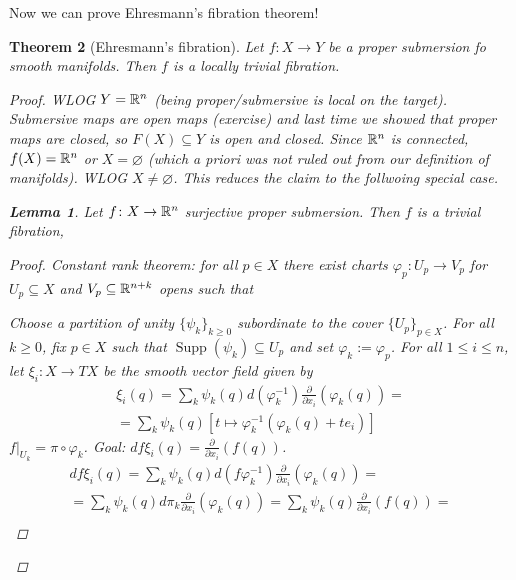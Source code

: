 \documentclass[A4paper, british, reqno]{amsart}
\theoremstyle{darkgreentheorem}
\newtheorem{thm}{Theorem}[section]
\newtheorem{lm}[thm]{Lemma}
\theoremstyle{darkbluedefinition}
\theoremstyle{darkredexample}
\theoremstyle{remark}
\DeclareMathOperator{\Supp}{Supp}
\newcommand{\1}{\mathbbm{1}}
\newcommand{\sub}{\subseteq}
\begin{document}
Now we can prove Ehresmann's fibration theorem!

\begin{thm}[Ehresmann's fibration]
    Let $f\colon X\to Y$ be a proper submersion fo smooth manifolds.
    Then $f$ is a locally trivial fibration.
    \begin{proof}
	WLOG $Y=\mathbb{R}^{n}$ (being proper/submersive is local on the target).
	Submersive maps are open maps (exercise) and last time we showed that proper maps are closed, so $F(X)\sub Y$ is open and closed.
	Since $\mathbb{R}^{n}$ is connected, $f(X)=\mathbb{R}^{n}$ or $X=\varnothing$ (which a priori was not ruled out from our definition of manifolds).
	WLOG $X\neq\varnothing$.
	This reduces the claim to the follwoing special case.
	\begin{lm}
	    Let $f\colon X\to \mathbb{R}^{n}$ surjective proper submersion.
	    Then $f$ is a trivial fibration,
	    \begin{proof}
		Constant rank theorem: for all $p\in X$ there exist charts $\varphi_{p}\colon U_{p}\to V_{p}$ for $U_{p}\sub X$ and $V_{p}\sub \R^{n+k}$ opens such that
		\begin{center}
		\end{center}
		Choose a partition of unity $\{\psi_{k}\}_{k\geqslant 0}$ subordinate to the cover $\{U_{p}\}_{p\in X}$.
		For all $k\geqslant 0$, fix $p\in X$ such that $\Supp(\psi_{k})\sub U_{p}$ and set $\varphi_{k}:=\varphi_{p}$.
		For all $1\leqslant i\leqslant n$, let $\xi_{i}\colon X\to TX$ be the smooth vector field given by
		\begin{multline*}
		    \xi_{i}(q)=\sum_{k}\psi_{k}(q)d(\varphi_{k}^{-1})\frac{\partial}{\partial x_{i}}(\varphi_{k}(q)) =\\
		    = \sum_{k}\psi_{k}(q)[t\mapsto \varphi^{-1}_{k}(\varphi_{k}(q)+te_{i}) ]
		\end{multline*}
		$f|_{U_{k}}=\pi\circ \varphi_{k}$.
		Goal: $df\xi_{i}(q)=\frac{\partial }{\partial x_{i}}(f(q))$.
		\begin{multline*}
		    df\xi_{i}(q)=\sum_{k}\psi_{k}(q)d(f\varphi_{k}^{-1})\frac{\partial }{\partial x_{i}}(\varphi_{k}(q)) =\\
		    =\sum_{k} \psi_{k}(q)d\pi_{k}\frac{\partial }{\partial x_{i}}(\varphi_{k}(q))=\sum_{k}\psi_{k}(q)\frac{\partial}{\partial x_{i}}(f(q)) =\\

\end{multline*}
\end{proof}
\end{lm}
\end{proof}
\end{thm}
\end{document}
